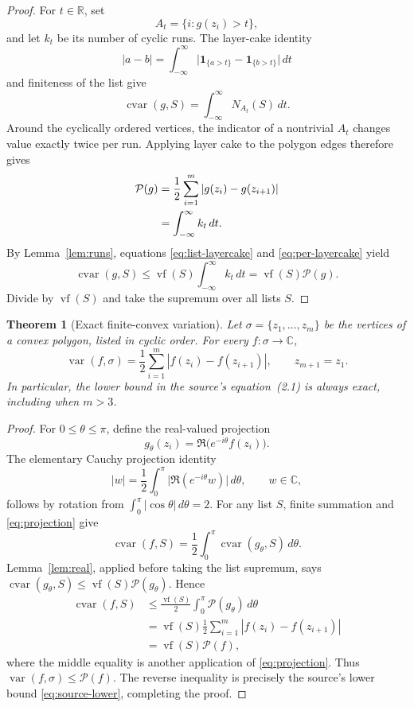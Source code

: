 \documentclass[11pt]{article}
\newtheorem{theorem}{Theorem}
\newcommand{\C}{\mathbb C}
\newcommand{\R}{\mathbb R}
\newcommand{\cvar}{\operatorname{cvar}}
\newcommand{\vf}{\operatorname{vf}}
\newcommand{\Var}{\operatorname{var}}
\newcommand{\Per}{\mathcal P}
\begin{document}
\begin{proof}
For $t\in\R$, set
\[
 A_t=\{i:g(z_i)>t\},
\]
and let $k_t$ be its number of cyclic runs.  The layer-cake identity
\[
 |a-b|=\int_{-\infty}^{\infty}
 \big|\mathbf1_{\{a>t\}}-\mathbf1_{\{b>t\}}\big|\,dt
\]
and finiteness of the list give
\begin{equation}
 \cvar(g,S)=\int_{-\infty}^{\infty}N_{A_t}(S)\,dt.
 \label{eq:list-layercake}
\end{equation}
Around the cyclically ordered vertices, the indicator of a nontrivial $A_t$
changes value exactly twice per run.  Applying layer cake to the polygon
edges therefore gives
\begin{align}
 \Per(g)
 &=\frac12\sum_{i=1}^{m}|g(z_i)-g(z_{i+1})|\notag\\
 &=\int_{-\infty}^{\infty}k_t\,dt.
 \label{eq:per-layercake}
\end{align}
By Lemma~\ref{lem:runs}, equations \eqref{eq:list-layercake} and
\eqref{eq:per-layercake} yield
\[
 \cvar(g,S)\leq\vf(S)\int_{-\infty}^{\infty}k_t\,dt
 =\vf(S)\Per(g).
\]
Divide by $\vf(S)$ and take the supremum over all lists $S$.
\end{proof}

\begin{theorem}[Exact finite-convex variation]
\label{thm:main}
Let $\sigma=\{z_1,\ldots,z_m\}$ be the vertices of a convex polygon, listed
in cyclic order.  For every $f:\sigma\to\C$,
\begin{equation}
 \boxed{\displaystyle
 \Var(f,\sigma)=\frac12\sum_{i=1}^{m}|f(z_i)-f(z_{i+1})|},
 \qquad z_{m+1}=z_1.
 \label{eq:exact}
\end{equation}
In particular, the lower bound in the source's equation~(2.1) is always exact,
including when $m>3$.
\end{theorem}

\begin{proof}
For $0\leq\theta\leq\pi$, define the real-valued projection
\[
 g_\theta(z_i)=\Re\bigl(e^{-i\theta}f(z_i)\bigr).
\]
The elementary Cauchy projection identity
\begin{equation}
 |w|=\frac12\int_0^\pi
 \big|\Re(e^{-i\theta}w)\big|\,d\theta,
 \qquad w\in\C,
 \label{eq:projection}
\end{equation}
follows by rotation from $\int_0^\pi|\cos\theta|\,d\theta=2$.
For any list $S$, finite summation and \eqref{eq:projection} give
\[
 \cvar(f,S)=\frac12\int_0^\pi\cvar(g_\theta,S)\,d\theta.
\]
Lemma~\ref{lem:real}, applied before taking the list supremum, says
$\cvar(g_\theta,S)\leq\vf(S)\Per(g_\theta)$.  Hence
\begin{align*}
 \cvar(f,S)
 &\leq \frac{\vf(S)}2\int_0^\pi\Per(g_\theta)\,d\theta\\
 &=\vf(S)\frac12\sum_{i=1}^{m}|f(z_i)-f(z_{i+1})|\\
 &=\vf(S)\Per(f),
\end{align*}
where the middle equality is another application of
\eqref{eq:projection}.  Thus $\Var(f,\sigma)\leq\Per(f)$.  The reverse
inequality is precisely the source's lower bound
\eqref{eq:source-lower}, completing the proof.
\end{proof}
\end{document}
